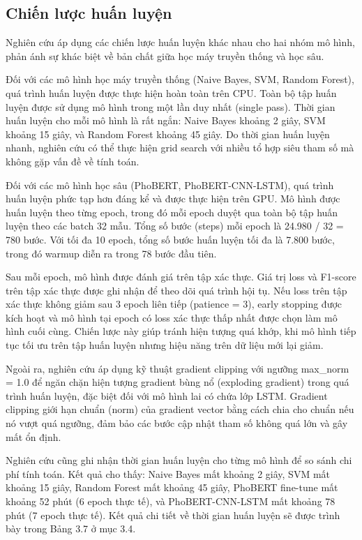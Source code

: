\documentclass[14pt, a4paper]{report}
\begin{document}
\subsection{Chiến lược huấn luyện}


Nghiên cứu áp dụng các chiến lược huấn luyện khác nhau cho hai nhóm mô hình, phản ánh sự khác biệt về bản chất giữa học máy truyền thống và học sâu.


Đối với các mô hình học máy truyền thống (Naive Bayes, SVM, Random Forest), quá trình huấn luyện được thực hiện hoàn toàn trên CPU. Toàn bộ tập huấn luyện được sử dụng  mô hình trong một lần duy nhất (single pass). Thời gian huấn luyện cho mỗi mô hình là rất ngắn: Naive Bayes khoảng 2 giây, SVM khoảng 15 giây, và Random Forest khoảng 45 giây. Do thời gian huấn luyện nhanh, nghiên cứu có thể thực hiện grid search với nhiều tổ hợp siêu tham số mà không gặp vấn đề về tính toán.


Đối với các mô hình học sâu (PhoBERT, PhoBERT-CNN-LSTM), quá trình huấn luyện phức tạp hơn đáng kể và được thực hiện trên GPU. Mô hình được huấn luyện theo từng epoch, trong đó mỗi epoch duyệt qua toàn bộ tập huấn luyện theo các batch 32 mẫu. Tổng số bước (steps) mỗi epoch là 24.980 / 32 = 780 bước. Với tối đa 10 epoch, tổng số bước huấn luyện tối đa là 7.800 bước, trong đó warmup diễn ra trong 78 bước đầu tiên.


Sau mỗi epoch, mô hình được đánh giá trên tập xác thực. Giá trị loss và F1-score trên tập xác thực được ghi nhận để theo dõi quá trình hội tụ. Nếu loss trên tập xác thực không giảm sau 3 epoch liên tiếp (patience = 3), early stopping được kích hoạt và mô hình tại epoch có loss xác thực thấp nhất được chọn làm mô hình cuối cùng. Chiến lược này giúp tránh hiện tượng quá khớp, khi mô hình tiếp tục tối ưu trên tập huấn luyện nhưng hiệu năng trên dữ liệu mới lại giảm.


Ngoài ra, nghiên cứu áp dụng kỹ thuật gradient clipping với ngưỡng max\_norm = 1.0 để ngăn chặn hiện tượng gradient bùng nổ (exploding gradient) trong quá trình huấn luyện, đặc biệt đối với mô hình lai có chứa lớp LSTM. Gradient clipping giới hạn chuẩn (norm) của gradient vector bằng cách chia cho chuẩn nếu nó vượt quá ngưỡng, đảm bảo các bước cập nhật tham số không quá lớn và gây mất ổn định.


Nghiên cứu cũng ghi nhận thời gian huấn luyện cho từng mô hình để so sánh chi phí tính toán. Kết quả cho thấy: Naive Bayes mất khoảng 2 giây, SVM mất khoảng 15 giây, Random Forest mất khoảng 45 giây, PhoBERT fine-tune mất khoảng 52 phút (6 epoch thực tế), và PhoBERT-CNN-LSTM mất khoảng 78 phút (7 epoch thực tế). Kết quả chi tiết về thời gian huấn luyện sẽ được trình bày trong Bảng 3.7 ở mục 3.4.
\end{document}
